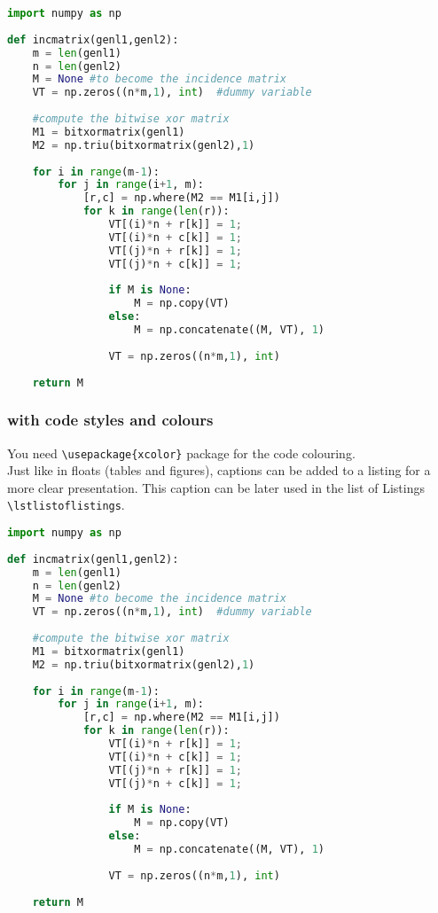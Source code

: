\documentclass[]{article}
\begin{document}
\begin{lstlisting}[language=Python]
import numpy as np
    
def incmatrix(genl1,genl2):
    m = len(genl1)
    n = len(genl2)
    M = None #to become the incidence matrix
    VT = np.zeros((n*m,1), int)  #dummy variable
    
    #compute the bitwise xor matrix
    M1 = bitxormatrix(genl1)
    M2 = np.triu(bitxormatrix(genl2),1) 
    
    for i in range(m-1):
        for j in range(i+1, m):
            [r,c] = np.where(M2 == M1[i,j])
            for k in range(len(r)):
                VT[(i)*n + r[k]] = 1;
                VT[(i)*n + c[k]] = 1;
                VT[(j)*n + r[k]] = 1;
                VT[(j)*n + c[k]] = 1;
    
                if M is None:
                    M = np.copy(VT)
                else:
                    M = np.concatenate((M, VT), 1)
    
                VT = np.zeros((n*m,1), int)
    
    return M
\end{lstlisting}


\subsubsection{with code styles and colours}

You need \verb+\usepackage{xcolor}+ package for the code colouring. \\
Just like in floats (tables and figures), captions can be added to a 
listing for a more clear presentation. This caption can be later used 
in the list of Listings \verb+\lstlistoflistings+.

\lstset{style=python-style}
\begin{lstlisting}[language=Python, caption=Python example]
import numpy as np
    
def incmatrix(genl1,genl2):
    m = len(genl1)
    n = len(genl2)
    M = None #to become the incidence matrix
    VT = np.zeros((n*m,1), int)  #dummy variable
    
    #compute the bitwise xor matrix
    M1 = bitxormatrix(genl1)
    M2 = np.triu(bitxormatrix(genl2),1) 
    
    for i in range(m-1):
        for j in range(i+1, m):
            [r,c] = np.where(M2 == M1[i,j])
            for k in range(len(r)):
                VT[(i)*n + r[k]] = 1;
                VT[(i)*n + c[k]] = 1;
                VT[(j)*n + r[k]] = 1;
                VT[(j)*n + c[k]] = 1;
    
                if M is None:
                    M = np.copy(VT)
                else:
                    M = np.concatenate((M, VT), 1)
    
                VT = np.zeros((n*m,1), int)
    
    return M
\end{lstlisting}
\end{document}

